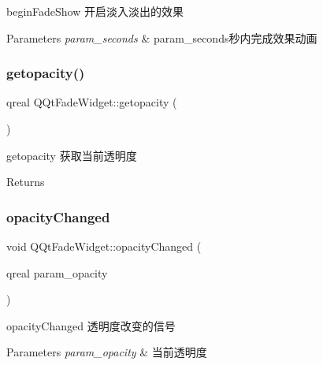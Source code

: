 begin\+Fade\+Show 开启淡入淡出的效果 


\begin{DoxyParams}{Parameters}
{\em param\+\_\+seconds} & param\+\_\+seconds秒内完成效果动画 \\
\hline
\end{DoxyParams}
\mbox{\label{class_q_qt_fade_widget_a58708b389df89b55be734538a938e1a0}} 
\subsubsection{\texorpdfstring{getopacity()}{getopacity()}}
{\footnotesize\ttfamily qreal Q\+Qt\+Fade\+Widget\+::getopacity (\begin{DoxyParamCaption}{ }\end{DoxyParamCaption})}



getopacity 获取当前透明度 

\begin{DoxyReturn}{Returns}

\end{DoxyReturn}
\mbox{\label{class_q_qt_fade_widget_a20b63cf911542b214040d1f87661fa72}} 
\subsubsection{\texorpdfstring{opacity\+Changed}{opacityChanged}}
{\footnotesize\ttfamily void Q\+Qt\+Fade\+Widget\+::opacity\+Changed (\begin{DoxyParamCaption}\item[{qreal}]{param\+\_\+opacity }\end{DoxyParamCaption})\hspace{0.3cm}{\ttfamily [signal]}}



opacity\+Changed 透明度改变的信号 


\begin{DoxyParams}{Parameters}
{\em param\+\_\+opacity} & 当前透明度 \\
\hline
\end{DoxyParams}
\mbox{\label{class_q_qt_fade_widget_a8f195e27ba76f89efaf22f459fa8411e}} 
